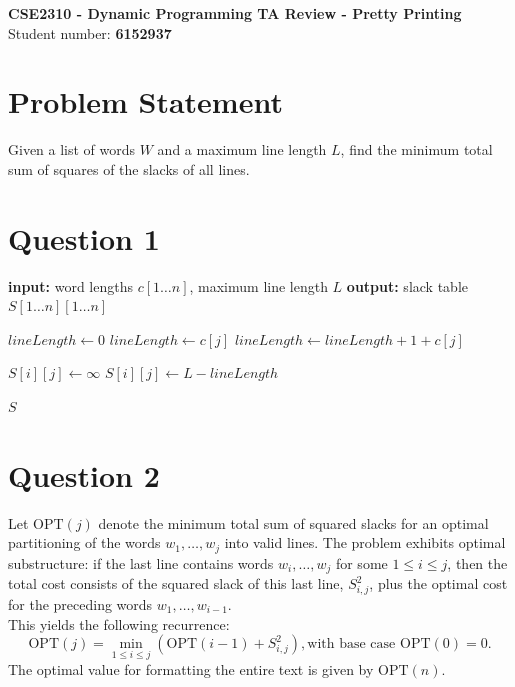 \documentclass[a4paper,11pt]{article}
\begin{document}
	\begin{center}
		{\Large \textbf{CSE2310 - Dynamic Programming TA Review - Pretty Printing}}\\[4pt]
		Student number: \textbf{6152937}
	\end{center}

	\vspace{1em}

	\section*{Problem Statement}
	Given a list of words $W$ and a maximum line length $L$, find the minimum total sum of squares of the slacks of all lines.

	\section{Question 1}

	\begin{algorithm}[H]
		\caption{Compute slack values $S_{i,j}$}
		\label{alg:compute_slack}
		\begin{algorithmic}[1]
			\State \textbf{input:} word lengths $c[1 \dots n]$, maximum line length $L$
			\State \textbf{output:} slack table $S[1 \dots n][1 \dots n]$

			\State $lineLength \gets 0$
			\State $lineLength \gets c[j]$
			\Else
			\State $lineLength \gets lineLength + 1 + c[j]$ 
			\EndIf

			\State $S[i][j] \gets \infty$
			\Else
			\State $S[i][j] \gets L - lineLength$
			\EndIf
			\EndFor
			\EndFor

			\State \Return $S$
		\end{algorithmic}
	\end{algorithm}

	\section{Question 2}
	Let $\mathrm{OPT}(j)$ denote the minimum total sum of squared slacks for an optimal partitioning of the words
	$w_1, \dots, w_j$ into valid lines. The problem exhibits optimal substructure: if the last line contains words
	$w_i, \dots, w_j$ for some $1 \le i \le j$, then the total cost consists of the squared slack of this last line,
	$S_{i,j}^2$, plus the optimal cost for the preceding words $w_1, \dots, w_{i-1}$.\\
	This yields the following recurrence:
	\[
	\mathrm{OPT}(j)
	=
	\min_{1 \le i \le j}
	\left(
	\mathrm{OPT}(i-1) + S_{i,j}^2
	\right),
	\text{with base case $\mathrm{OPT}(0) = 0$.}
	\]
	The optimal value for formatting the entire text is given by $\mathrm{OPT}(n)$.
\end{document}
